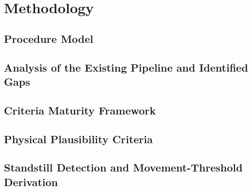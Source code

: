 \chapter{Methodology}
\label{kap:Methodik}


\section{Procedure Model}
\label{sec:Methodik_Vorgehensmodell}

\section{Analysis of the Existing Pipeline and Identified Gaps}
\label{sec:Methodik_PipelineGaps}

\section{Criteria Maturity Framework}
\label{sec:Methodik_MaturityFramework}

\section{Physical Plausibility Criteria}
\label{sec:Methodik_PhysicalPlausibility}

\section{Standstill Detection and Movement-Threshold Derivation}
\label{sec:Methodik_Standstill}

